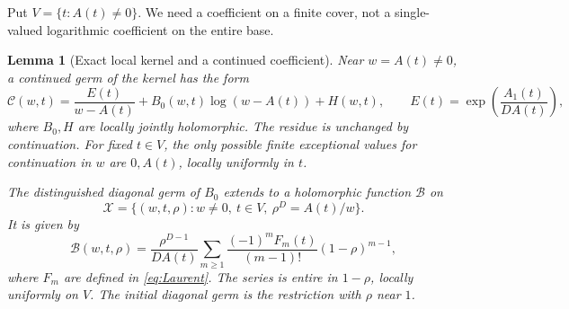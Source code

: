\documentclass[11pt]{article}
\numberwithin{equation}{section}
\newtheorem{lemma}[theorem]{Lemma}
\theoremstyle{definition}\newtheorem{definition}[theorem]{Definition}
\theoremstyle{remark}\newtheorem{remark}[theorem]{Remark}
\newcommand{\CC}{\mathcal C}
\begin{document}
Put $V=\{t:A(t)\ne0\}$. We need a coefficient on a finite cover, not a
single-valued logarithmic coefficient on the entire base.
\begin{lemma}[Exact local kernel and a continued coefficient]\label{lem:kernel}
Near $w=A(t)\ne0$, a continued germ of the kernel has the form
\begin{equation}\label{eq:local-kernel}
 \CC(w,t)=\frac{E(t)}{w-A(t)}+
 B_0(w,t)\log(w-A(t))+H(w,t),\qquad
 E(t)=\exp\!\left(\frac{A_1(t)}{DA(t)}\right),
\end{equation}
where $B_0,H$ are locally jointly holomorphic. The residue is unchanged
by continuation. For fixed $t\in V$, the only possible finite exceptional
values for continuation in $w$ are $0,A(t)$, locally uniformly in $t$.

The distinguished diagonal germ of $B_0$ extends to a holomorphic function
$\mathscr B$ on
\begin{equation}\label{eq:cover}
 \mathscr X=\{(w,t,\rho):w\ne0,\ t\in V,\ \rho^D=A(t)/w\}.
\end{equation}
It is given by
\begin{equation}\label{eq:global-B}
 \mathscr B(w,t,\rho)=\frac{\rho^{D-1}}{DA(t)}
 \sum_{m\ge1}\frac{(-1)^mF_m(t)}{(m-1)!}(1-\rho)^{m-1},
\end{equation}
where $F_m$ are defined in \eqref{eq:Laurent}. The series is entire in
$1-\rho$, locally uniformly on $V$. The initial diagonal germ is the
restriction with $\rho$ near $1$.
\end{lemma}
\end{document}
